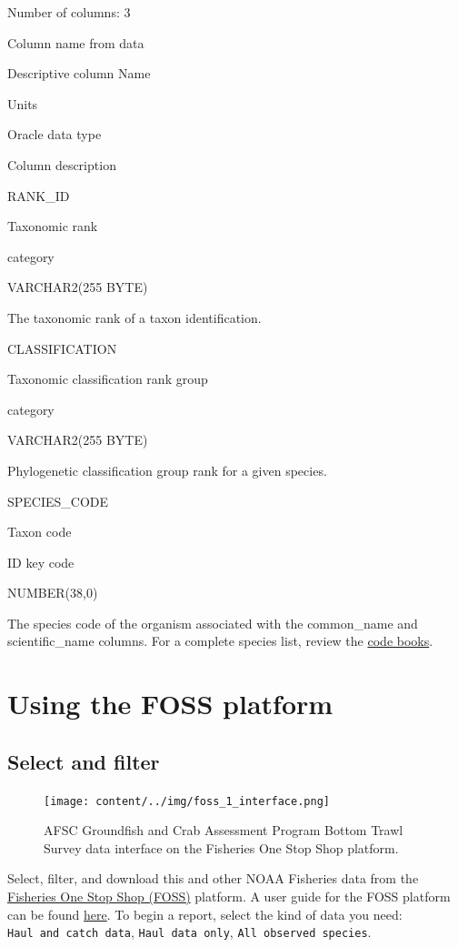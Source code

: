 \documentclass[
  letterpaper,
  oneside,
  open=any]{scrbook}
\begin{document}
Number of columns: 3

Column name from data

Descriptive column Name

Units

Oracle data type

Column description

RANK\_ID

Taxonomic rank

category

VARCHAR2(255 BYTE)

The taxonomic rank of a taxon identification.

CLASSIFICATION

Taxonomic classification rank group

category

VARCHAR2(255 BYTE)

Phylogenetic classification group rank for a given species.

SPECIES\_CODE

Taxon code

ID key code

NUMBER(38,0)

The species code of the organism associated with the common\_name and
scientific\_name columns. For a complete species list, review the
\href{https://www.fisheries.noaa.gov/resource/document/groundfish-survey-species-code-manual-and-data-codes-manual}{code
books}.

\chapter{Using the FOSS platform}\label{using-the-foss-platform}

\section{Select and filter}\label{select-and-filter}

\begin{figure}[H]

{\centering \texttt{[image: content/../img/foss\_1\_interface.png]}

}

\caption{AFSC Groundfish and Crab Assessment Program Bottom Trawl Survey
data interface on the Fisheries One Stop Shop platform.}

\end{figure}%

Select, filter, and download this and other NOAA Fisheries data from the
\href{https://www.fisheries.noaa.gov/foss}{Fisheries One Stop Shop
(FOSS)} platform. A user guide for the FOSS platform can be found
\href{https://www.fisheries.noaa.gov/foss/f?p=215:7:7542600605674:::::}{here}.
To begin a report, select the kind of data you need:
\texttt{Haul\ and\ catch\ data}, \texttt{Haul\ data\ only},
\texttt{All\ observed\ species}.
\end{document}
